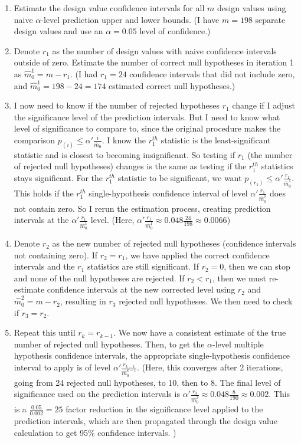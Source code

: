 \documentclass[12pt]{article}
\begin{document}
\begin{enumerate}
    \item Estimate the design value confidence intervals for all $m$ design values using naive $\alpha$-level prediction upper and lower bounds. (I have $m=198$ separate design values and use an $\alpha=0.05$ level of confidence.)
    \item Denote $r_1$ as the number of design values with naive confidence intervals outside of zero. Estimate the number of correct null hypotheses in iteration 1 as $\hat m_0^1 = m - r_1$. (I had $r_1=24$ confidence intervals that did not include zero, and $\hat m_0^1 = 198 - 24 = 174$ estimated correct null hypotheses.)
    \item I now need to know if the number of rejected hypotheses $r_1$ change if I adjust the significance level of the prediction intervals. But I need to know what level of significance to compare to, since the original procedure makes the comparison $p_{(i)} \leq \alpha'\frac{i}{\hat m_0}$. I know the $r_1^{th}$ statistic is the least-significant statistic and is closest to becoming insignificant. So testing if $r_1$ (the number of rejected null hypotheses) changes is the same as testing if the $r_1^{th}$ statistics stays significant. For the $r_1^{th}$ statistic to be significant, we want $p_{(r_1)} \leq \alpha'\frac{r_1}{\hat m_0^1}$. This holds if the $r_1^{th}$ single-hypothesis confidence interval of level $\alpha'\frac{r_1}{\hat m_0^1}$ does not contain zero. So I rerun the estimation process, creating prediction intervals at the $\alpha'\frac{r_1}{\hat m_0^1}$ level. (Here, $\alpha'\frac{r_1}{\hat m_0^1}  \approx 0.048 \frac{24}{198} \approx 0.0066$)
    \item Denote $r_2$ as the new number of rejected null hypotheses (confidence intervals not containing zero). If $r_2=r_1$, we have applied the correct confidence intervals and the $r_1$ statistics are still significant. If $r_2=0$, then we can stop and none of the null hypotheses are rejected. If $r_2<r_1$, then we must re-estimate confidence intervals at the new corrected level using $r_2$ and  $\hat m_0^2 = m - r_2$, resulting in $r_3$ rejected null hypotheses. We then need to check if $r_3=r_2$.
    \item Repeat this until $r_k = r_{k-1}$. We now have a consistent estimate of the true number of rejected null hypotheses. Then, to get the $\alpha$-level multiple hypothesis confidence intervals, the appropriate single-hypothesis confidence interval to apply is of level $\alpha'\frac{r_{k-1}}{\hat m_0^{k-1}}$. (Here, this converges after 2 iterations, going from 24 rejected null hypotheses, to 10, then to 8. The final level of significance used on the prediction intervals is $\alpha'\frac{r_3}{\hat m_0^3} \approx 0.048 \frac{8}{190} \approx 0.002$. This is a $\frac{0.05}{0.002}=25$ factor reduction in the significance level applied to the prediction intervals, which are then propagated through the design value calculation to get 95\% confidence intervals. )
\end{enumerate}
\end{document}
